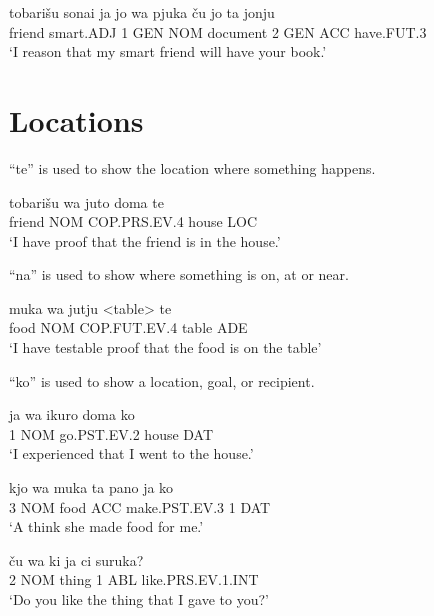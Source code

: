 \documentclass{clgrammar}
\begin{document}
\begin{exe}
	\ex 
	\gll tobarišu sonai ja jo wa pjuka ču jo ta jonju \\
	friend smart.ADJ 1 GEN NOM document 2 GEN ACC have.FUT.3 \\
	\trans `I reason that my smart friend will have your book.' 
\end{exe}

\section{Locations}
``te'' is used to show the location where something happens.  

\begin{exe}
	\ex 
	\gll tobarišu wa juto doma te \\
	friend NOM COP.PRS.EV.4 house LOC \\
	\trans `I have proof that the friend is in the house.' 
\end{exe}
 
``na'' is used to show where something is on, at or near.  

\begin{exe}
	\ex 
	\gll muka wa jutju <table> te   \\
	food NOM COP.FUT.EV.4 table ADE \\
	\trans `I have testable proof that the food is on the table' 
\end{exe}

``ko'' is used to show a location, goal, or recipient. 

\begin{exe}
	\ex 
	\gll ja wa ikuro doma ko \\
	1 NOM go.PST.EV.2 house DAT \\ 
	\trans `I experienced that I went to the house.'
\end{exe}

\begin{exe}
	\ex
	\gll kjo wa muka ta pano ja ko \\
	3 NOM food ACC make.PST.EV.3 1 DAT \\
	\trans `A think she made food for me.'
\end{exe}

\begin{exe}
	\ex
	\gll ču wa ki ja ci suruka? \\
	2 NOM thing 1 ABL like.PRS.EV.1.INT \\
	\trans `Do you like the thing that I gave to you?'
\end{exe}
\end{document}
